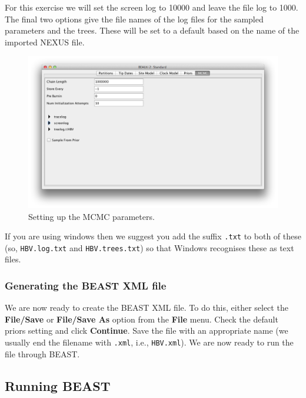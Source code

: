 \documentclass{article}
\begin{document}
For this exercise we will set the screen log to 10000 and leave the file log to 1000. The final two
options give the file names of the log files for the sampled parameters and
the trees. These will be set to a default based on the name of the
imported NEXUS file. 

\begin{figure}
\begin{center}

\includegraphics[scale=0.4]{figures/BEAUti_MCMC}

\end{center}
\caption{\label{fig.MCMC} Setting up the MCMC parameters.}
\end{figure}


If you are using windows then we suggest you add the suffix \texttt{.txt} to both of these (so,
\texttt{HBV.log.txt} and \texttt{HBV.trees.txt}) so that Windows recognises
these as text files. 

\subsubsection*{Generating the BEAST XML file }

We are now ready to create the BEAST XML file. To do this, either select the {\bf File/Save} or {\bf File/Save As} option from the \textbf{File} menu. Check the default priors setting and click \textbf{Continue}. Save the file with an appropriate name (we usually end the filename with \texttt{.xml}, i.e., \texttt{HBV.xml}). We are now ready to run the file through BEAST. 

\subsection*{Running BEAST }
\end{document}
